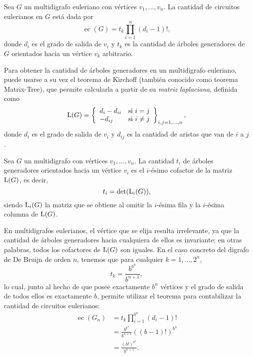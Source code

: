 \begin{theorem*}
	Sea $G$ un multidigrafo euleriano con vértices $v_1, \dots, v_n$.
	La cantidad de circuitos eulerianos en $G$ está dada por
	\[ \operatorname{ec}(G) = t_k \prod_{i=1}^n (d_i - 1)!, \]
	donde $d_i$ es el grado de salida de $v_i$ y $t_k$ es la cantidad de árboles
	generadores de $G$ orientados hacia un vértice $v_k$ arbitrario.
\end{theorem*}

Para obtener la cantidad de árboles generadores en un multidigrafo euleriano,
puede usarse a su vez el teorema de Kirchoff (también conocido como teorema
Matrix-Tree), que permite calcularla
a partir de su \emph{matriz laplaciana}, definida como
\[ \operatorname{L}(G) = \left\lbrace \begin{array}{ll}
	d_i - d_{ii} & \text{si $i = j$} \\
	-d_{ij}       & \text{si $i \neq j$}
\end{array} \right\rbrace_{i,j = 1,\dots,n}, \]
donde $d_i$ es el grado de salida de $v_i$ y $d_{ij}$ es la cantidad de
aristas que van de $i$ a $j$.

\begin{theorem*}
	Sea $G$ un multidigrafo con vértices $v_1, \dots, v_n$. La cantidad $t_i$
	de árboles generadores orientados hacia un vértice $v_i$ es el $i$-ésimo
	cofactor de la matriz $\operatorname{L}(G)$, es decir,
	\[ t_i = \operatorname{det}(\operatorname{L}_i(G)), \]
	siendo $\operatorname{L}_i(G)$ la matriz que se obtiene al omitir la $i$-ésima fila
	y la $i$-ésima columna de $\operatorname{L}(G)$.
\end{theorem*}

En multidigrafos eulerianos, el vértice que se elija resulta irrelevante, ya
que la cantidad de árboles generadores hacia cualquiera de ellos es invariante;
en otras palabras, todos los cofactores de $\operatorname{L}(G)$ son iguales. En
el caso concreto del digrafo de De Bruijn de orden $n$, tenemos que
\cite{van-aardenne-ehrenfest-circuits-and-trees} para cualquier
$k = 1, \dots, 2^n$,
\[ t_k = \frac{b^{b^{n}}}{b^{n+1}}, \]
lo cual, junto al hecho de que posee exactamente $b^n$ vértices y el grado de
salida de todos ellos es exactamente $b$, permite utilizar el teorema \BEST{} para
contabilizar la cantidad de circuitos eulerianos:
\begin{align*}
	\operatorname{ec}(G_n) &= t_k \prod_{i=1}^{b^n} (d_i - 1)! \\
		&= \frac{b^{b^{n}}}{b^{n+1}} \left((b - 1)!\right)^{b^n} \\
		&= \frac{(b!)^{b^{n}}}{b^{n+1}}.
\end{align*}

